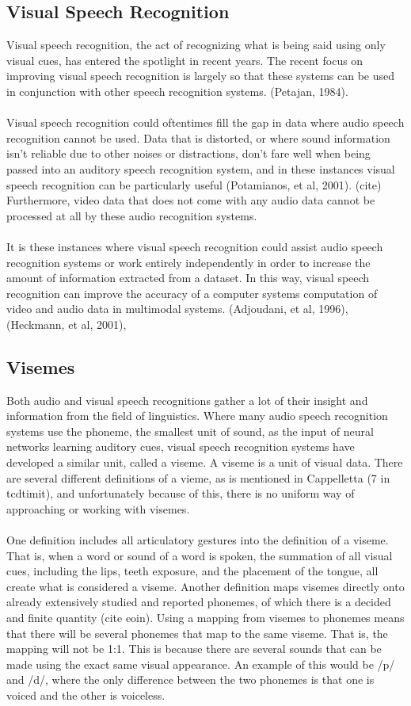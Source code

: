 \documentclass[12pt,twoside]{report}
\begin{document}
		\subsection{Visual Speech Recognition}
Visual speech recognition, the act of recognizing what is being said using only visual cues, has entered the spotlight in recent years. The recent focus on improving visual speech recognition is largely so that these systems can be used in conjunction with other speech recognition systems. (Petajan, 1984).
\\ \\
Visual speech recognition could oftentimes fill the gap in data where audio speech recognition cannot be used. Data that is distorted, or where sound information isn’t reliable due to other noises or distractions, don’t fare well when being passed into an auditory speech recognition system, and in these instances visual speech recognition can be particularly useful  (Potamianos, et al, 2001). (cite) Furthermore, video data that does not come with any audio data cannot be processed at all by these audio recognition systems. 
\\ \\
It is these instances where visual speech recognition could assist audio speech recognition systems or work entirely independently in order to increase the amount of information extracted from a dataset. In this way, visual speech recognition can improve the accuracy of a computer systems computation of video and audio data in multimodal systems. (Adjoudani, et al, 1996), (Heckmann, et al, 2001), 

		\subsection{Visemes}
Both audio and visual speech recognitions gather a lot of their insight and information from the field of linguistics. Where many audio speech recognition systems use the phoneme, the smallest unit of sound, as the input of neural networks learning auditory cues, visual speech recognition systems have developed a similar unit, called a viseme. A viseme is a unit of visual data. There are several different definitions of a vieme, as is mentioned in Cappelletta (7 in tcdtimit), and unfortunately because of this, there is no uniform way of approaching or working with visemes. 
\\ \\
One definition includes all articulatory gestures into the definition of a viseme. That is, when a word or sound of a word is spoken, the summation of all visual cues, including the lips, teeth exposure, and the placement of the tongue, all create what is considered a viseme. Another definition maps visemes directly onto already extensively studied and reported phonemes, of which there is a decided and finite quantity (cite eoin). Using a mapping from visemes to phonemes means that there will be several phonemes that map to the same viseme. That is, the mapping will not be 1:1. This is because there are several sounds that can be made using the exact same visual appearance. An example of this would be /p/ and /d/, where the only difference between the two phonemes is that one is voiced and the other is voiceless. 
\end{document}
